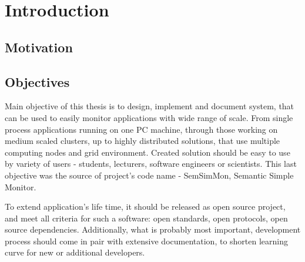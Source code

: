 %


\chapter{Introduction}
\label{cha:intro}


\section{Motivation}
\label{ch1:Motivation}







\section{Objectives}
\label{ch1:Objectives}

Main objective of this thesis is to design, implement and document system, that can be used to easily monitor
applications with wide range of scale. From single process applications running on one PC machine, through those
working on medium scaled clusters, up to highly distributed solutions, that use multiple computing nodes and grid
environment. Created solution should be easy to use by variety of users - students, lecturers, software engineers or
scientists. This last objective was the source of project's code name - SemSimMon, Semantic Simple Monitor. 

To extend application's life time, it should be released as open source project, and meet all criteria for such a
software: open standards, open protocols, open source dependencies. Additionally, what is probably most important,
development process should come in pair with extensive documentation, to shorten learning curve for new or additional
developers.

